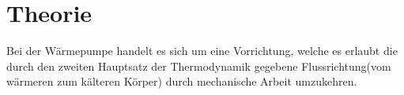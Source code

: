 \section{Theorie}
\label{sec:Theorie}
Bei der Wärmepumpe handelt es sich um eine Vorrichtung, welche es erlaubt die durch den zweiten Hauptsatz der Thermodynamik gegebene Flussrichtung(vom wärmeren zum kälteren Körper) durch
mechanische Arbeit umzukehren. 